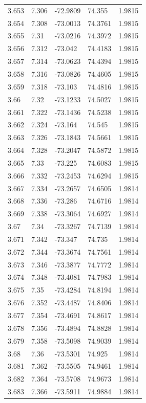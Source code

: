 \begin{tabular}{lllll}
3.653 & 7.306 & -72.9809 & 74.355 & 1.9815 \\
3.654 & 7.308 & -73.0013 & 74.3761 & 1.9815 \\
3.655 & 7.31 & -73.0216 & 74.3972 & 1.9815 \\
3.656 & 7.312 & -73.042 & 74.4183 & 1.9815 \\
3.657 & 7.314 & -73.0623 & 74.4394 & 1.9815 \\
3.658 & 7.316 & -73.0826 & 74.4605 & 1.9815 \\
3.659 & 7.318 & -73.103 & 74.4816 & 1.9815 \\
3.66 & 7.32 & -73.1233 & 74.5027 & 1.9815 \\
3.661 & 7.322 & -73.1436 & 74.5238 & 1.9815 \\
3.662 & 7.324 & -73.164 & 74.545 & 1.9815 \\
3.663 & 7.326 & -73.1843 & 74.5661 & 1.9815 \\
3.664 & 7.328 & -73.2047 & 74.5872 & 1.9815 \\
3.665 & 7.33 & -73.225 & 74.6083 & 1.9815 \\
3.666 & 7.332 & -73.2453 & 74.6294 & 1.9815 \\
3.667 & 7.334 & -73.2657 & 74.6505 & 1.9814 \\
3.668 & 7.336 & -73.286 & 74.6716 & 1.9814 \\
3.669 & 7.338 & -73.3064 & 74.6927 & 1.9814 \\
3.67 & 7.34 & -73.3267 & 74.7139 & 1.9814 \\
3.671 & 7.342 & -73.347 & 74.735 & 1.9814 \\
3.672 & 7.344 & -73.3674 & 74.7561 & 1.9814 \\
3.673 & 7.346 & -73.3877 & 74.7772 & 1.9814 \\
3.674 & 7.348 & -73.4081 & 74.7983 & 1.9814 \\
3.675 & 7.35 & -73.4284 & 74.8194 & 1.9814 \\
3.676 & 7.352 & -73.4487 & 74.8406 & 1.9814 \\
3.677 & 7.354 & -73.4691 & 74.8617 & 1.9814 \\
3.678 & 7.356 & -73.4894 & 74.8828 & 1.9814 \\
3.679 & 7.358 & -73.5098 & 74.9039 & 1.9814 \\
3.68 & 7.36 & -73.5301 & 74.925 & 1.9814 \\
3.681 & 7.362 & -73.5505 & 74.9461 & 1.9814 \\
3.682 & 7.364 & -73.5708 & 74.9673 & 1.9814 \\
3.683 & 7.366 & -73.5911 & 74.9884 & 1.9814 \\

\end{tabular}
